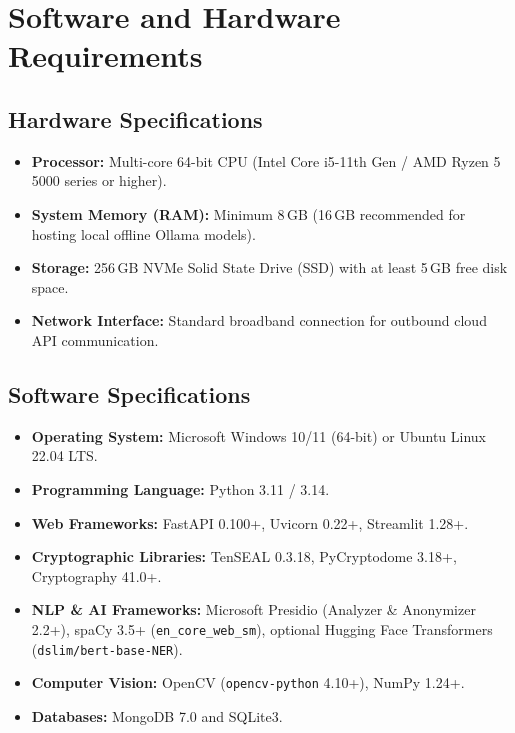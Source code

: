 \section{Software and Hardware Requirements}

\subsection{Hardware Specifications}
\begin{itemize}[leftmargin=*]
    \item \textbf{Processor:} Multi-core 64-bit CPU (Intel Core i5-11th Gen / AMD Ryzen 5 5000 series or higher).
    \item \textbf{System Memory (RAM):} Minimum 8\,GB (16\,GB recommended for hosting local offline Ollama models).
    \item \textbf{Storage:} 256\,GB NVMe Solid State Drive (SSD) with at least 5\,GB free disk space.
    \item \textbf{Network Interface:} Standard broadband connection for outbound cloud API communication.
\end{itemize}

\subsection{Software Specifications}
\begin{itemize}[leftmargin=*]
    \item \textbf{Operating System:} Microsoft Windows 10/11 (64-bit) or Ubuntu Linux 22.04 LTS.
    \item \textbf{Programming Language:} Python 3.11 / 3.14.
    \item \textbf{Web Frameworks:} FastAPI 0.100+, Uvicorn 0.22+, Streamlit 1.28+.
    \item \textbf{Cryptographic Libraries:} TenSEAL 0.3.18, PyCryptodome 3.18+, Cryptography 41.0+.
    \item \textbf{NLP \& AI Frameworks:} Microsoft Presidio (Analyzer \& Anonymizer 2.2+), spaCy 3.5+ (\texttt{en\_core\_web\_sm}), optional Hugging Face Transformers (\texttt{dslim/bert-base-NER}).
    \item \textbf{Computer Vision:} OpenCV (\texttt{opencv-python} 4.10+), NumPy 1.24+.
    \item \textbf{Databases:} MongoDB 7.0 and SQLite3.
\end{itemize}


